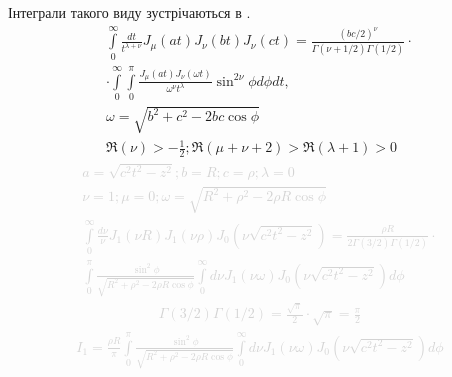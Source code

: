 Інтеграли такого виду зустрічаються в \cite[ст. 398]{Watson1922}.
\begin{equation} \begin{aligned} \label{eq:intJJJtable}
\int\limits_{0}^{\infty} \frac{d t}{t^{\lambda + \nu}} 
J_\mu \left( at \right) J_\nu \left( bt \right) J_\nu \left( ct \right) =
\frac{ \left( bc/2 \right) ^\nu }
{ \Gamma \left( \nu + 1/2 \right) \Gamma \left( 1/2 \right) } \cdot \\
\cdot \int\limits_{0}^{\infty} \int\limits_{0}^{\pi}
\frac{J_\mu \left( at \right) J_\nu \left( \omega t \right)}
{\omega^\nu t^\lambda} \sin^{2\nu}{\phi} d\phi dt, \\
\omega = \sqrt{b^2 + c^2 - 2bc \cos \phi} \\
\Re \left( \nu \right) > - \frac{1}{2};
\Re \left( \mu + \nu + 2 \right) > \Re \left( \lambda + 1 \right) > 0
\end{aligned} \end{equation}
%
\textcolor{lightgray}{ \begin{equation*} \begin{aligned}
a = \sqrt{c^2 t^2 - z^2}; b = R; c = \rho; \lambda = 0 \\
\nu = 1; \mu = 0; \omega = \sqrt{R^2 + \rho^2 - 2 \rho R \cos \phi} \\
\int\limits_{0}^{\infty} \frac{d\nu}{\nu} 
J_1 \left( \nu R \right) J_1 \left( \nu \rho \right) 
J_0 \left( \nu \sqrt{c^2 t^2 - z^2} \right) = 
\frac{\rho R}{ 2 \Gamma \left( 3/2 \right) \Gamma \left( 1/2 \right) } \cdot \\
\int\limits_{0}^{\pi} 
\frac{\sin^2{\phi}}{\sqrt{R^2 + \rho^2 - 2 \rho R \cos \phi}}
\int\limits_{0}^{\infty} d \nu J_1 \left( \nu \omega \right) 
J_0 \left( \nu \sqrt{c^2 t^2 - z^2} \right) d \phi
\end{aligned} \end{equation*} }
%
\textcolor{lightgray}{ \begin{equation*} \begin{aligned}
\Gamma \left( 3/2 \right) \Gamma \left( 1/2 \right) = 
\frac{\sqrt{\pi}}{2} \cdot \sqrt{\pi} = \frac{\pi}{2} 
\end{aligned} \end{equation*} }
%
\textcolor{lightgray}{ \begin{equation*} \begin{aligned}
I_1 = \frac{\rho R}{\pi} \int\limits_{0}^{\pi} 
\frac{\sin^2{\phi}}{\sqrt{R^2 + \rho^2 - 2 \rho R \cos \phi}}
\int\limits_{0}^{\infty} d \nu J_1 \left( \nu \omega \right) 
J_0 \left( \nu \sqrt{c^2 t^2 - z^2} \right) d \phi
\end{aligned} \end{equation*} }

